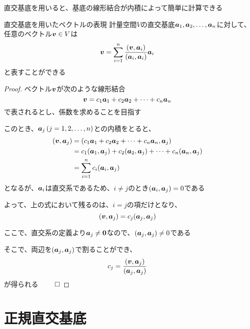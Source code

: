 \documentclass[../../../topic_linear-algebra]{subfiles}
\begin{document}
\sectionline

直交基底を用いると、基底の線形結合が内積によって簡単に計算できる

\begin{theorem}{直交基底を用いたベクトルの表現}
  計量空間$V$の直交基底$\vb*{a}_1, \vb*{a}_2, \ldots, \vb*{a}_n$に対して、任意のベクトル$\vb*{v} \in V$は
  \begin{equation*}
    \vb*{v} = \sum_{i=1}^n \frac{(\vb*{v}, \vb*{a}_i)}{(\vb*{a}_i, \vb*{a}_i)} \vb*{a}_i
  \end{equation*}
  と表すことができる
\end{theorem}

\begin{proof}
  ベクトル$\vb*{v}$が次のような線形結合
  \begin{equation*}
    \vb*{v} = c_1 \vb*{a}_1 + c_2 \vb*{a}_2 + \cdots + c_n \vb*{a}_n
  \end{equation*}
  で表されるとし、係数を求めることを目指す

  このとき、$\vb*{a}_j\, (j=1,2,\ldots,n)$との内積をとると、
  \begin{align*}
    (\vb*{v}, \vb*{a}_j) & = (c_1 \vb*{a}_1 + c_2 \vb*{a}_2 + \cdots + c_n \vb*{a}_n, \vb*{a}_j)                           \\
                         & = c_1 (\vb*{a}_1, \vb*{a}_j) + c_2 (\vb*{a}_2, \vb*{a}_j) + \cdots + c_n (\vb*{a}_n, \vb*{a}_j) \\
                         & = \sum_{i=1}^n c_i (\vb*{a}_i, \vb*{a}_j)
  \end{align*}
  となるが、$\vb*{a}_i$は直交系であるため、$i \neq j$のとき$(\vb*{a}_i, \vb*{a}_j) = 0$である

  よって、上の式において残るのは、$i=j$の項だけとなり、
  \begin{equation*}
    (\vb*{v}, \vb*{a}_j) = c_j (\vb*{a}_j, \vb*{a}_j)
  \end{equation*}

  ここで、直交系の定義より$\vb*{a}_j \neq \vb*{0}$なので、$(\vb*{a}_j, \vb*{a}_j) \neq 0$である

  そこで、両辺を$(\vb*{a}_j, \vb*{a}_j)$で割ることができ、
  \begin{equation*}
    c_j = \frac{(\vb*{v}, \vb*{a}_j)}{(\vb*{a}_j, \vb*{a}_j)}
  \end{equation*}
  が得られる $\qed$
\end{proof}

\sectionline
\section{正規直交基底}
\end{document}
